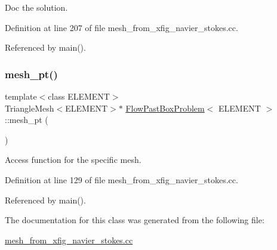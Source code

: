 Doc the solution. 



Definition at line 207 of file mesh\+\_\+from\+\_\+xfig\+\_\+navier\+\_\+stokes.\+cc.



Referenced by main().

\mbox{\label{classFlowPastBoxProblem_a3efbee75a2cc6ca9d6ffd4ec0a3a2c52}} 
\subsubsection{\texorpdfstring{mesh\+\_\+pt()}{mesh\_pt()}}
{\footnotesize\ttfamily template$<$class E\+L\+E\+M\+E\+NT$>$ \\
Triangle\+Mesh$<$E\+L\+E\+M\+E\+NT$>$$\ast$ \hyperlink{classFlowPastBoxProblem}{Flow\+Past\+Box\+Problem}$<$ E\+L\+E\+M\+E\+NT $>$\+::mesh\+\_\+pt (\begin{DoxyParamCaption}{ }\end{DoxyParamCaption})\hspace{0.3cm}{\ttfamily [inline]}}



Access function for the specific mesh. 



Definition at line 129 of file mesh\+\_\+from\+\_\+xfig\+\_\+navier\+\_\+stokes.\+cc.



Referenced by main().



The documentation for this class was generated from the following file\+:\begin{DoxyCompactItemize}
\item 
\hyperlink{mesh__from__xfig__navier__stokes_8cc}{mesh\+\_\+from\+\_\+xfig\+\_\+navier\+\_\+stokes.\+cc}\end{DoxyCompactItemize}
